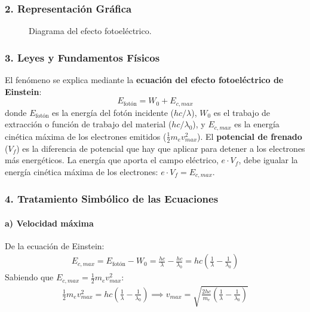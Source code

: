 \subsubsection*{2. Representación Gráfica}
\begin{figure}[H]
    \centering
    \caption{Diagrama del efecto fotoeléctrico.}
\end{figure}

\subsubsection*{3. Leyes y Fundamentos Físicos}
El fenómeno se explica mediante la \textbf{ecuación del efecto fotoeléctrico de Einstein}:
$$ E_{\text{fotón}} = W_0 + E_{c,max} $$
donde $E_{\text{fotón}}$ es la energía del fotón incidente ($hc/\lambda$), $W_0$ es el trabajo de extracción o función de trabajo del material ($hc/\lambda_0$), y $E_{c,max}$ es la energía cinética máxima de los electrones emitidos ($\frac{1}{2}m_e v_{max}^2$).
El \textbf{potencial de frenado} ($V_f$) es la diferencia de potencial que hay que aplicar para detener a los electrones más energéticos. La energía que aporta el campo eléctrico, $e \cdot V_f$, debe igualar la energía cinética máxima de los electrones: $e \cdot V_f = E_{c,max}$.

\subsubsection*{4. Tratamiento Simbólico de las Ecuaciones}
\paragraph{a) Velocidad máxima}
De la ecuación de Einstein:
\begin{gather}
    E_{c,max} = E_{\text{fotón}} - W_0 = \frac{hc}{\lambda} - \frac{hc}{\lambda_0} = hc\left(\frac{1}{\lambda} - \frac{1}{\lambda_0}\right)
\end{gather}
Sabiendo que $E_{c,max} = \frac{1}{2}m_e v_{max}^2$:
\begin{gather}
    \frac{1}{2}m_e v_{max}^2 = hc\left(\frac{1}{\lambda} - \frac{1}{\lambda_0}\right) \implies v_{max} = \sqrt{\frac{2hc}{m_e}\left(\frac{1}{\lambda} - \frac{1}{\lambda_0}\right)}
\end{gather}

